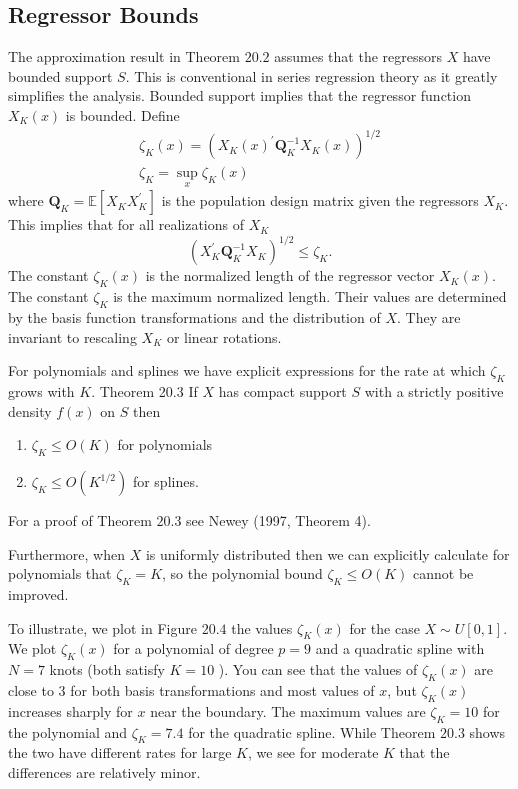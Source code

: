 \documentclass[10pt]{article}
\begin{document}
\subsection{Regressor Bounds}
The approximation result in Theorem $20.2$ assumes that the regressors $X$ have bounded support $S$. This is conventional in series regression theory as it greatly simplifies the analysis. Bounded support implies that the regressor function $X_{K}(x)$ is bounded. Define
$$
\begin{gathered}
\zeta_{K}(x)=\left(X_{K}(x)^{\prime} \boldsymbol{Q}_{K}^{-1} X_{K}(x)\right)^{1 / 2} \\
\zeta_{K}=\sup _{x} \zeta_{K}(x)
\end{gathered}
$$
where $\boldsymbol{Q}_{K}=\mathbb{E}\left[X_{K} X_{K}^{\prime}\right]$ is the population design matrix given the regressors $X_{K}$. This implies that for all realizations of $X_{K}$
$$
\left(X_{K}^{\prime} \boldsymbol{Q}_{K}^{-1} X_{K}\right)^{1 / 2} \leq \zeta_{K} .
$$
The constant $\zeta_{K}(x)$ is the normalized length of the regressor vector $X_{K}(x)$. The constant $\zeta_{K}$ is the maximum normalized length. Their values are determined by the basis function transformations and the distribution of $X$. They are invariant to rescaling $X_{K}$ or linear rotations.

For polynomials and splines we have explicit expressions for the rate at which $\zeta_{K}$ grows with $K$. Theorem 20.3 If $X$ has compact support $S$ with a strictly positive density $f(x)$ on $S$ then

\begin{enumerate}
  \item $\zeta_{K} \leq O(K)$ for polynomials

  \item $\zeta_{K} \leq O\left(K^{1 / 2}\right)$ for splines.

\end{enumerate}
For a proof of Theorem $20.3$ see Newey (1997, Theorem 4).

Furthermore, when $X$ is uniformly distributed then we can explicitly calculate for polynomials that $\zeta_{K}=K$, so the polynomial bound $\zeta_{K} \leq O(K)$ cannot be improved.

To illustrate, we plot in Figure $20.4$ the values $\zeta_{K}(x)$ for the case $X \sim U[0,1]$. We plot $\zeta_{K}(x)$ for a polynomial of degree $p=9$ and a quadratic spline with $N=7$ knots (both satisfy $K=10$ ). You can see that the values of $\zeta_{K}(x)$ are close to 3 for both basis transformations and most values of $x$, but $\zeta_{K}(x)$ increases sharply for $x$ near the boundary. The maximum values are $\zeta_{K}=10$ for the polynomial and $\zeta_{K}=7.4$ for the quadratic spline. While Theorem $20.3$ shows the two have different rates for large $K$, we see for moderate $K$ that the differences are relatively minor.
\end{document}
